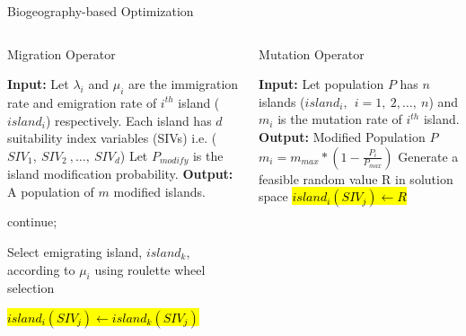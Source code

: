 \documentclass [9pt,times] {beamer}
\begin{document}
\begin{frame}[fragile]{Biogeography-based Optimization}

\begin{columns}
\begin{column}{5cm}
\begin{block}{Migration Operator \cite{ma2010analysis}}
\begin{algorithm}[H]
\scriptsize
\begin{algorithmic}[1]

\STATE \textbf{Input:} Let  $\lambda_i$ and $\mu_i$ are the immigration rate and emigration rate of $i^{th}$ island ($island_i$) respectively.
\STATE Each island has $d$ suitability index variables (SIVs) i.e.  ($SIV_1, \ SIV_2\ ,\dots, \ SIV_d$) 
\STATE Let $P_{modify}$ is the island modification probability.
\STATE \textbf{Output:}  A population of $m$ modified islands.

    \STATE    continue;
  \ENDIF


        \STATE Select emigrating island, $island_k$, according to $\mu_i$ using roulette wheel selection

           \STATE  \hl{$island_i(SIV_j) \leftarrow island_k(SIV_j)$}
    \ENDIF
\ENDFOR
\ENDFOR
\end{algorithmic}
\end{algorithm}
\end{block}
\end{column}


\begin{column}{5cm}
\begin{block}{Mutation Operator \cite{ma2010analysis}}
\begin{algorithm}[H]
\scriptsize
\begin{algorithmic}[1]
\STATE \textbf{Input:} Let population $P$ has $n$ islands ($island_i,\ \ i=1,\ 2,\dots, \ n$) and $m_i$ is the mutation rate of $i^{th}$ island. 
	\STATE \textbf{Output: } Modified Population $P$
\STATE $m_i=m_{max}*(1-\frac{P_i}{P_{max}} )$
        \STATE Generate a feasible random value R in solution space
        \STATE \hl{$island_i (SIV_j) \leftarrow R$}
    \ENDIF
    \ENDFOR
\end{algorithmic}
\end{algorithm}
\end{block}
\end{column}
\end{columns}


\end{frame}
\end{document}
